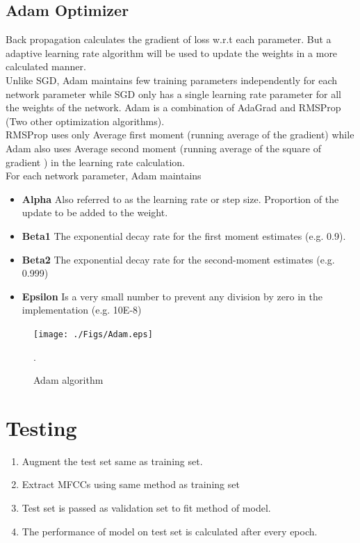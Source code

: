 \documentclass[11pt,english]{article}
\begin{document}
\subsection{Adam Optimizer}
Back propagation calculates the gradient of loss w.r.t each parameter. But a adaptive learning rate algorithm will be used to update the weights in a more calculated manner.\\
Unlike SGD, Adam maintains few training parameters independently for each network parameter while SGD only has a single learning rate parameter for all the weights of the network. Adam is a combination of AdaGrad and RMSProp (Two other optimization algorithms).\\
RMSProp uses only Average first moment (running average of the gradient) while Adam also uses Average second moment (running average of the square of gradient ) in the learning rate calculation.\\
For each network parameter, Adam maintains 
\begin{itemize}
    \item \textbf{Alpha}
    Also referred to as the learning rate or step size. 
    Proportion of the update to be added to the weight.
    \item \textbf{Beta1}
    The exponential decay rate for the first moment estimates (e.g. 0.9).
    \item \textbf{Beta2}
    The exponential decay rate for the second-moment estimates (e.g. 0.999)
    \item \textbf{Epsilon}
    Is a very small number to prevent any division by zero in the implementation (e.g. 10E-8)
\end{itemize}


\begin{figure}[!ht]
\centering
\texttt{[image: ./Figs/Adam.eps]}
\caption{ Adam algorithm}.
\label{fig: Adam}	
\end{figure}


\section{Testing}
\begin{enumerate}
    \item Augment the test set same as training set.
    \item Extract MFCCs using same method as training set
    \item Test set is passed as validation set to fit method of model.
    \item The performance of model on test set is calculated after every epoch.
\end{enumerate}
\end{document}
